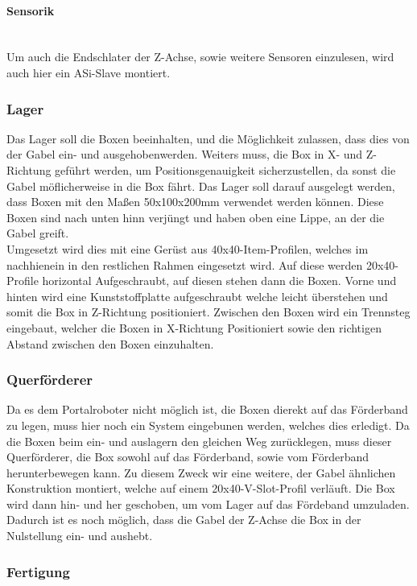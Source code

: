 \paragraph{Sensorik}\mbox{}\\
Um auch die Endschlater der Z-Achse, sowie weitere Sensoren einzulesen, wird auch hier ein ASi-Slave montiert.

\subsubsection{Lager}
Das Lager soll die Boxen beeinhalten, und die Möglichkeit zulassen, dass dies von der Gabel ein- und ausgehobenwerden. Weiters muss, die Box in X- und Z-Richtung geführt werden, um Positionsgenauigkeit sicherzustellen, da sonst die Gabel möflicherweise in die Box fährt. Das Lager soll darauf ausgelegt werden, dass Boxen mit den Maßen 50x100x200mm verwendet werden können. Diese Boxen sind nach unten hinn verjüngt und haben oben eine Lippe, an der die Gabel greift.\\
Umgesetzt wird dies mit eine Gerüst aus 40x40-Item-Profilen, welches im nachhienein in den restlichen Rahmen eingesetzt wird. Auf diese werden 20x40-Profile horizontal Aufgeschraubt, auf diesen stehen dann die Boxen. Vorne und hinten wird eine Kunststoffplatte aufgeschraubt welche leicht überstehen und somit die Box in Z-Richtung positioniert. Zwischen den Boxen wird ein Trennsteg eingebaut, welcher die Boxen in X-Richtung Positioniert sowie den richtigen Abstand zwischen den Boxen einzuhalten.

\subsubsection{Querförderer}
Da es dem Portalroboter nicht möglich ist, die Boxen dierekt auf das Förderband zu legen, muss hier noch ein System eingebunen werden, welches dies erledigt. Da die Boxen beim ein- und auslagern den gleichen Weg zurücklegen, muss dieser Querförderer, die Box sowohl auf das Förderband, sowie vom Förderband herunterbewegen kann. 
Zu diesem Zweck wir eine weitere, der Gabel ähnlichen Konstruktion montiert, welche auf einem 20x40-V-Slot-Profil verläuft. Die Box wird dann hin- und her geschoben, um vom Lager auf das Fördeband umzuladen. Dadurch ist es noch möglich, dass die Gabel der Z-Achse die Box in der Nulstellung ein- und aushebt.


\subsubsection{Fertigung}

